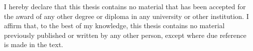 
\begin{declaration}

I hereby declare that this thesis contains no material that has been accepted for the award of any other degree or diploma
in any university or other institution. I affirm that, to the best of my knowledge, this thesis contains no material
previously published or written by any other person, except where due reference is made in the text.


\end{declaration}

